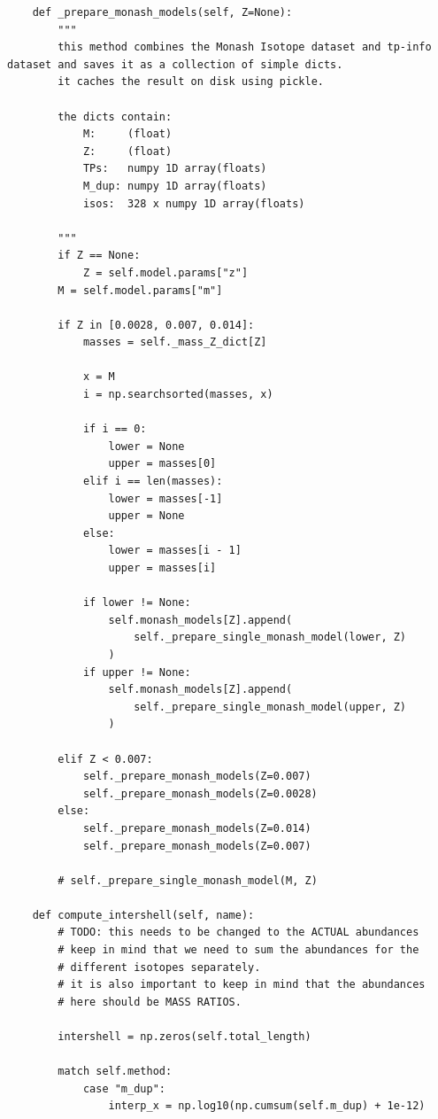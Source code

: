 \documentclass[a4paper,10pt]{article}
\begin{document}
\begin{verbatim}
    def _prepare_monash_models(self, Z=None):
        """
        this method combines the Monash Isotope dataset and tp-info dataset and saves it as a collection of simple dicts.
        it caches the result on disk using pickle.

        the dicts contain:
            M:     (float)
            Z:     (float)
            TPs:   numpy 1D array(floats)
            M_dup: numpy 1D array(floats)
            isos:  328 x numpy 1D array(floats)

        """
        if Z == None:
            Z = self.model.params["z"]
        M = self.model.params["m"]

        if Z in [0.0028, 0.007, 0.014]:
            masses = self._mass_Z_dict[Z]

            x = M
            i = np.searchsorted(masses, x)

            if i == 0:
                lower = None
                upper = masses[0]
            elif i == len(masses):
                lower = masses[-1]
                upper = None
            else:
                lower = masses[i - 1]
                upper = masses[i]

            if lower != None:
                self.monash_models[Z].append(
                    self._prepare_single_monash_model(lower, Z)
                )
            if upper != None:
                self.monash_models[Z].append(
                    self._prepare_single_monash_model(upper, Z)
                )

        elif Z < 0.007:
            self._prepare_monash_models(Z=0.007)
            self._prepare_monash_models(Z=0.0028)
        else:
            self._prepare_monash_models(Z=0.014)
            self._prepare_monash_models(Z=0.007)

        # self._prepare_single_monash_model(M, Z)

    def compute_intershell(self, name):
        # TODO: this needs to be changed to the ACTUAL abundances
        # keep in mind that we need to sum the abundances for the
        # different isotopes separately.
        # it is also important to keep in mind that the abundances
        # here should be MASS RATIOS.

        intershell = np.zeros(self.total_length)

        match self.method:
            case "m_dup":
                interp_x = np.log10(np.cumsum(self.m_dup) + 1e-12)


\end{verbatim}
\end{document}
